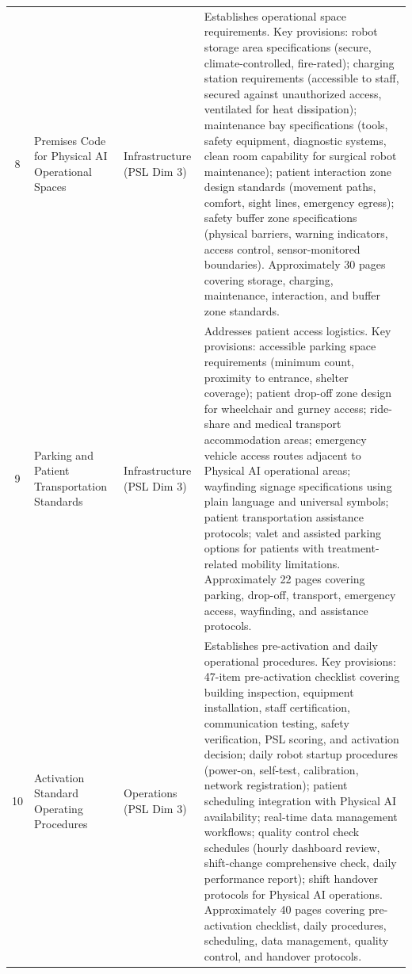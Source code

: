 \begin{longtable}{c l l p{8cm}}
8 & Premises Code for Physical AI Operational Spaces & Infrastructure (PSL Dim 3) & Establishes operational space requirements. Key provisions: robot storage area specifications (secure, climate-controlled, fire-rated); charging station requirements (accessible to staff, secured against unauthorized access, ventilated for heat dissipation); maintenance bay specifications (tools, safety equipment, diagnostic systems, clean room capability for surgical robot maintenance); patient interaction zone design standards (movement paths, comfort, sight lines, emergency egress); safety buffer zone specifications (physical barriers, warning indicators, access control, sensor-monitored boundaries). Approximately 30 pages covering storage, charging, maintenance, interaction, and buffer zone standards. \\
9 & Parking and Patient Transportation Standards & Infrastructure (PSL Dim 3) & Addresses patient access logistics. Key provisions: accessible parking space requirements (minimum count, proximity to entrance, shelter coverage); patient drop-off zone design for wheelchair and gurney access; ride-share and medical transport accommodation areas; emergency vehicle access routes adjacent to Physical AI operational areas; wayfinding signage specifications using plain language and universal symbols; patient transportation assistance protocols; valet and assisted parking options for patients with treatment-related mobility limitations. Approximately 22 pages covering parking, drop-off, transport, emergency access, wayfinding, and assistance protocols. \\
10 & Activation Standard Operating Procedures & Operations (PSL Dim 3) & Establishes pre-activation and daily operational procedures. Key provisions: 47-item pre-activation checklist covering building inspection, equipment installation, staff certification, communication testing, safety verification, PSL scoring, and activation decision; daily robot startup procedures (power-on, self-test, calibration, network registration); patient scheduling integration with Physical AI availability; real-time data management workflows; quality control check schedules (hourly dashboard review, shift-change comprehensive check, daily performance report); shift handover protocols for Physical AI operations. Approximately 40 pages covering pre-activation checklist, daily procedures, scheduling, data management, quality control, and handover protocols. \\

\end{longtable}
